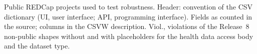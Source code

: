 \begin{table}[!htb]
\caption{Public REDCap projects used to test robustness. Header: convention of the CSV
dictionary (UI, user interface; API, programming interface). Fields as counted in the
source; columns in the CSVW description. Viol., violations of the Release~8 non-public shapes
without and with placeholders for the health data access body and the dataset type.}
\label{tab:corpus}
\footnotesize

\end{table}

